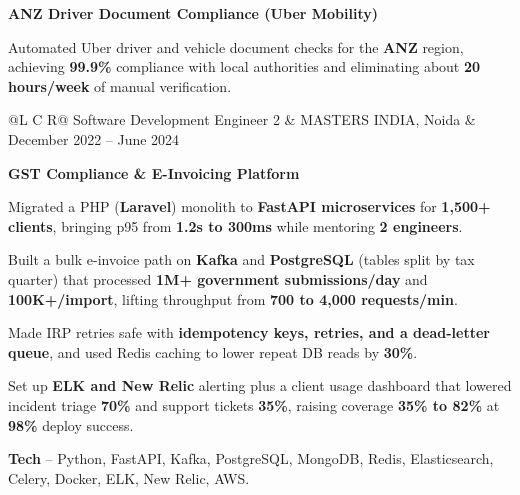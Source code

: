 \textcolor{Project}{\textbf{ANZ Driver Document Compliance (Uber Mobility)}}
\vspace{-1ex}
\begin{zitemize}
    \item Automated Uber driver and vehicle document checks for the \textbf{ANZ} region, achieving \textbf{99.9\%} compliance with local authorities and eliminating about \textbf{20 hours/week} of manual verification.
\end{zitemize}

\vspace{0.15ex}
\noindent
\begin{tabularx}{\textwidth}{@{}L C R@{}}
\textcolor{role}{Software Development Engineer 2} & \textcolor{company}{MASTERS INDIA, Noida} & \textcolor{date}{December 2022 -- June 2024}\\
\end{tabularx}
\vspace{-2ex}

\textcolor{Project}{\textbf{GST Compliance \& E-Invoicing Platform}}
\vspace{-1ex}
\begin{zitemize}
    \item Migrated a PHP (\textbf{Laravel}) monolith to \textbf{FastAPI microservices} for \textbf{1,500+ clients}, bringing p95 from \textbf{1.2s to 300ms} while mentoring \textbf{2 engineers}.
    \item Built a bulk e-invoice path on \textbf{Kafka} and \textbf{PostgreSQL} (tables split by tax quarter) that processed \textbf{1M+ government submissions/day} and \textbf{100K+/import}, lifting throughput from \textbf{700 to 4,000 requests/min}.
    \item Made IRP retries safe with \textbf{idempotency keys, retries, and a dead-letter queue}, and used Redis caching to lower repeat DB reads by \textbf{30\%}.
    \item Set up \textbf{ELK and New Relic} alerting plus a client usage dashboard that lowered incident triage \textbf{70\%} and support tickets \textbf{35\%}, raising coverage \textbf{35\% to 82\%} at \textbf{98\%} deploy success.
    \item \textbf{Tech} -- Python, FastAPI, Kafka, PostgreSQL, MongoDB, Redis, Elasticsearch, Celery, Docker, ELK, New Relic, AWS.
\end{zitemize}

